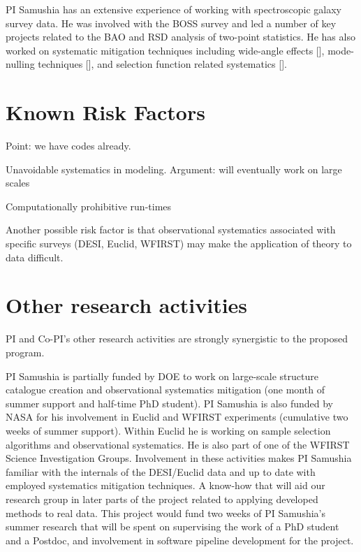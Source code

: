 PI Samushia has an extensive experience of working with spectroscopic galaxy
survey data. He was involved with the BOSS survey and led a number of key
projects related to the BAO and RSD analysis of two-point statistics. He has
also worked on systematic mitigation techniques including wide-angle effects
[], mode-nulling techniques [], and selection function related systematics [].





\section{Known Risk Factors}

Point: we have codes already.

Unavoidable systematics in modeling. Argument: will eventually work on large
scales

Computationally prohibitive run-times

Another possible risk factor is that observational
systematics associated with specific surveys (DESI, Euclid, WFIRST) may make
the application of theory to data difficult. 

\section{Other research activities}

PI and Co-PI's other research activities are strongly synergistic to the
proposed program.

PI Samushia is partially funded by DOE to work on large-scale structure
catalogue creation and observational systematics mitigation (one month of
summer support and half-time PhD student). PI Samushia is also funded by NASA
for his involvement in Euclid and WFIRST experiments (cumulative two weeks of
summer support). Within Euclid he is working on sample selection algorithms
and observational systematics. He is also part of one of the WFIRST Science
Investigation Groups. Involvement in these activities makes PI Samushia
familiar with  the internals of the DESI/Euclid data and up to date with
employed systematics mitigation techniques. A know-how that will aid our
research group in later parts of the project related to applying  developed
methods to real data. This project would fund two weeks of PI Samushia's
summer research that will be spent on supervising the work of a PhD student
and a Postdoc, and involvement in software pipeline development for the
project.

